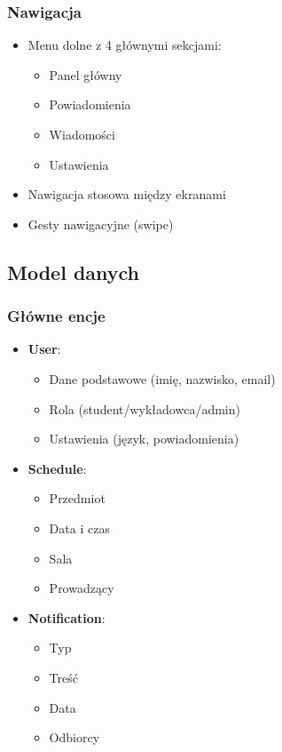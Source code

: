 \subsubsection{Nawigacja}
\begin{itemize}
  \item Menu dolne z 4 głównymi sekcjami:
        \begin{itemize}
          \item Panel główny
          \item Powiadomienia
          \item Wiadomości
          \item Ustawienia
        \end{itemize}
  \item Nawigacja stosowa między ekranami
  \item Gesty nawigacyjne (swipe)
\end{itemize}

\subsection{Model danych}

\subsubsection{Główne encje}
\begin{itemize}
  \item \textbf{User}:
        \begin{itemize}
          \item Dane podstawowe (imię, nazwisko, email)
          \item Rola (student/wykładowca/admin)
          \item Ustawienia (język, powiadomienia)
        \end{itemize}
        
  \item \textbf{Schedule}:
        \begin{itemize}
          \item Przedmiot
          \item Data i czas
          \item Sala
          \item Prowadzący
        \end{itemize}
        
  \item \textbf{Notification}:
        \begin{itemize}
          \item Typ
          \item Treść
          \item Data
          \item Odbiorcy
        \end{itemize}
\end{itemize}

